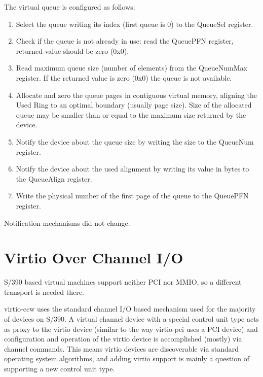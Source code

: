 The virtual queue is configured as follows:
\begin{enumerate}
\item Select the queue writing its index (first queue is 0) to the
   QueueSel register.

\item Check if the queue is not already in use: read the QueuePFN
   register, returned value should be zero (0x0).

\item Read maximum queue size (number of elements) from the
   QueueNumMax register. If the returned value is zero (0x0) the
   queue is not available.

\item Allocate and zero the queue pages in contiguous virtual
   memory, aligning the Used Ring to an optimal boundary (usually
   page size). Size of the allocated queue may be smaller than or
   equal to the maximum size returned by the device.

\item Notify the device about the queue size by writing the size to
   the QueueNum register.

\item Notify the device about the used alignment by writing its value
   in bytes to the QueueAlign register.

\item Write the physical number of the first page of the queue to
   the QueuePFN register.
\end{enumerate}

Notification mechanisms did not change.

\section{Virtio Over Channel I/O}\label{sec:Virtio Transport Options / Virtio Over Channel I/O}

S/390 based virtual machines support neither PCI nor MMIO, so a
different transport is needed there.

virtio-ccw uses the standard channel I/O based mechanism used for
the majority of devices on S/390. A virtual channel device with a
special control unit type acts as proxy to the virtio device
(similar to the way virtio-pci uses a PCI device) and
configuration and operation of the virtio device is accomplished
(mostly) via channel commands. This means virtio devices are
discoverable via standard operating system algorithms, and adding
virtio support is mainly a question of supporting a new control
unit type.

